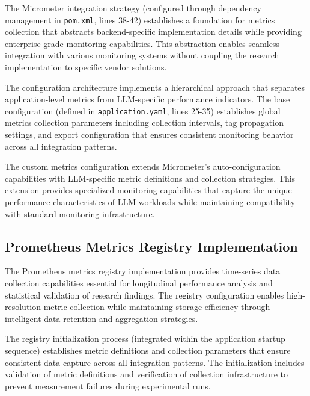 The Micrometer integration strategy (configured through dependency management in \texttt{pom.xml}, lines 38-42) establishes a foundation for metrics collection that abstracts backend-specific implementation details while providing enterprise-grade monitoring capabilities. This abstraction enables seamless integration with various monitoring systems without coupling the research implementation to specific vendor solutions.


The configuration architecture implements a hierarchical approach that separates application-level metrics from LLM-specific performance indicators. The base configuration (defined in \texttt{application.yaml}, lines 25-35) establishes global metrics collection parameters including collection intervals, tag propagation settings, and export configuration that ensures consistent monitoring behavior across all integration patterns.


The custom metrics configuration extends Micrometer's auto-configuration capabilities with LLM-specific metric definitions and collection strategies. This extension provides specialized monitoring capabilities that capture the unique performance characteristics of LLM workloads while maintaining compatibility with standard monitoring infrastructure.

\subsection{Prometheus Metrics Registry Implementation}

The Prometheus metrics registry implementation provides time-series data collection capabilities essential for longitudinal performance analysis and statistical validation of research findings. The registry configuration enables high-resolution metric collection while maintaining storage efficiency through intelligent data retention and aggregation strategies.

The registry initialization process (integrated within the application startup sequence) establishes metric definitions and collection parameters that ensure consistent data capture across all integration patterns. The initialization includes validation of metric definitions and verification of collection infrastructure to prevent measurement failures during experimental runs.

